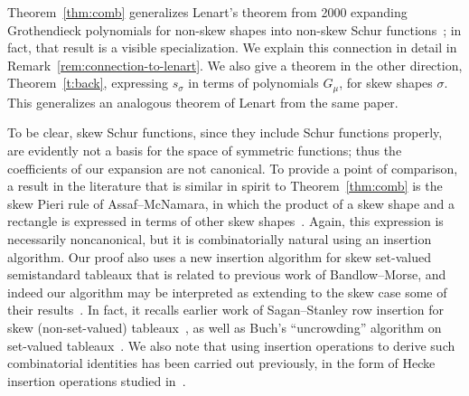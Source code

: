 \documentclass[11pt]{article}
\theoremstyle{definition}
\begin{document}
Theorem~\ref{thm:comb} generalizes Lenart's theorem from 2000 expanding Grothendieck polynomials for non-skew shapes into non-skew Schur functions~\cite{lenart-combinatorial}; in fact, that result is a visible specialization. We explain this connection in detail in Remark~\ref{rem:connection-to-lenart}. We also give a theorem in the other direction, Theorem~\ref{t:back}, expressing $s_\sigma$ in terms of polynomials $G_\mu$, for skew shapes $\sigma$. This generalizes an analogous theorem of Lenart from the same paper.



To be clear, skew Schur functions, since they include Schur functions properly, are evidently not a basis for the space of symmetric functions; thus the coefficients of our expansion are not canonical. 
To provide a point of comparison, a result in the literature that is similar in spirit to Theorem~\ref{thm:comb} is the skew Pieri rule of Assaf--McNamara, in which the product of a skew shape and a rectangle is expressed in terms of other skew shapes~\cite[Theorem~3.2]{assaf-mcnamara-pieri}. Again, this expression is necessarily noncanonical, but it is combinatorially natural using an insertion algorithm. Our proof also uses a new insertion algorithm for skew set-valued semistandard tableaux that is related to previous work of Bandlow--Morse, and indeed our algorithm may be interpreted as extending to the skew case some of their results~\cite[\S~5]{bandlow-morse-combinatorial}. In fact, it recalls earlier work of Sagan--Stanley row insertion for skew (non-set-valued) tableaux~\cite{sagan-stanley-robinson}, as well as Buch's ``uncrowding'' algorithm on set-valued tableaux~\cite[\S~6]{buch-littlewood-richardson}. We also note that using insertion operations to derive such combinatorial identities has been carried out previously, in the form of Hecke insertion operations studied in~\cite{bksty-stable}.

\end{document}
